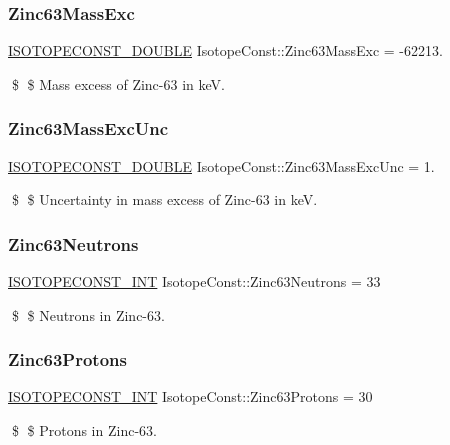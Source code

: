 \subsubsection{\texorpdfstring{Zinc63\+Mass\+Exc}{Zinc63MassExc}}
{\footnotesize\ttfamily \mbox{\hyperlink{group___isotope_const-_macros_ga8f45a7272ce02c0b4c65c44636ed719a}{I\+S\+O\+T\+O\+P\+E\+C\+O\+N\+S\+T\+\_\+\+D\+O\+U\+B\+LE}} Isotope\+Const\+::\+Zinc63\+Mass\+Exc = -\/62213.}

\$ \$ Mass excess of Zinc-\/63 in keV. \mbox{\label{group___isotope_const-_zinc-_zn63_ga30e2590d4fc21057c0b57267a9cf42aa}} 
\subsubsection{\texorpdfstring{Zinc63\+Mass\+Exc\+Unc}{Zinc63MassExcUnc}}
{\footnotesize\ttfamily \mbox{\hyperlink{group___isotope_const-_macros_ga8f45a7272ce02c0b4c65c44636ed719a}{I\+S\+O\+T\+O\+P\+E\+C\+O\+N\+S\+T\+\_\+\+D\+O\+U\+B\+LE}} Isotope\+Const\+::\+Zinc63\+Mass\+Exc\+Unc = 1.}

\$ \$ Uncertainty in mass excess of Zinc-\/63 in keV. \mbox{\label{group___isotope_const-_zinc-_zn63_ga7bcf9535144b595d02b5cf30c77ea062}} 
\subsubsection{\texorpdfstring{Zinc63\+Neutrons}{Zinc63Neutrons}}
{\footnotesize\ttfamily \mbox{\hyperlink{group___isotope_const-_macros_ga5f18360b3e99483a35c32d789e62621c}{I\+S\+O\+T\+O\+P\+E\+C\+O\+N\+S\+T\+\_\+\+I\+NT}} Isotope\+Const\+::\+Zinc63\+Neutrons = 33}

\$ \$ Neutrons in Zinc-\/63. \mbox{\label{group___isotope_const-_zinc-_zn63_ga91542f491e9195a34182bb26367e544a}} 
\subsubsection{\texorpdfstring{Zinc63\+Protons}{Zinc63Protons}}
{\footnotesize\ttfamily \mbox{\hyperlink{group___isotope_const-_macros_ga5f18360b3e99483a35c32d789e62621c}{I\+S\+O\+T\+O\+P\+E\+C\+O\+N\+S\+T\+\_\+\+I\+NT}} Isotope\+Const\+::\+Zinc63\+Protons = 30}

\$ \$ Protons in Zinc-\/63. 